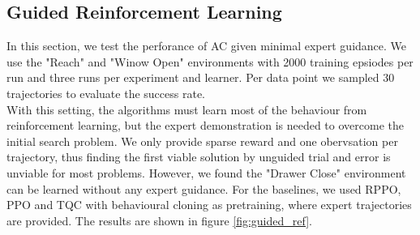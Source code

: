 \subsection{Guided Reinforcement Learning}
\label{sec:g_ref_ler}
In this section, we test the perforance of AC given minimal expert guidance. We use the "Reach" and "Winow Open" environments with 2000 training epsiodes per run and three runs per experiment and learner. 
Per data point we sampled 30 trajectories to evaluate the success rate.\\ 
With this setting, the algorithms must learn most of the behaviour from reinforcement learning, but the expert 
demonstration is needed to overcome the initial search problem. We only provide sparse reward and one obervsation per trajectory, thus finding the first viable solution by unguided 
trial and error is unviable for most problems. However, we found the "Drawer Close" environment can be learned without any expert guidance. 
For the baselines, we used RPPO, PPO and TQC with behavioural cloning as pretraining, where expert trajectories are provided. The results 
are shown in figure \ref{fig:guided_ref}. 


